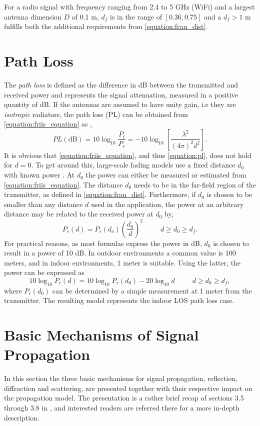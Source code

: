 \documentclass{LTHthesis}
\begin{document}
For a radio signal with frequency ranging from 2.4 to 5 GHz (WiFi) and a largest antenna dimension $D$ of 0.1 m, $d_f$ is in the
range of $\left[0.36,0.75\right]$  and a $d_f>1$ m fulfills both the additional requirements from \ref{equation:frau_dist}.
%
\section{Path Loss}
%
The \emph{path loss} is defined as the difference in dB between the transmitted and received power and represents the signal attenuation, measured in a positive quantity of dB. If the antennas are assumed to have unity gain, i.e they are \emph{isotropic} radiators, the path loss (PL) can be obtained from \ref{equation:friis_equation} as \cite{rappaport96}, 
%
\begin{equation}
PL\left(\text{dB}\right)=10\log_{10}{\frac{P_t}{P_r}}=-10\log_{10}{\left[\frac{\lambda^2}{\left(4\pi\right)^2d^2}\right]}\label{equation:pl}.
\end{equation} 
%
It is obvious that \ref{equation:friis_equation}, and thus \ref{equation:pl}, does not hold for $d=0$. To get around this, large-scale fading models use a fixed distance $d_0$ with known power \cite{rappaport96}. At $d_0$ the power can either be measured or estimated from \ref{equation:friis_equation}. The distance $d_0$ needs to be in the far-field region of the transmitter, as defined in \ref{equation:frau_dist}. Furthermore, if $d_0$ is chosen to be smaller than any distance $d$ used in the application, the power at an arbitrary distance may be related to the received power at $d_0$ by,
%
\begin{equation}
P_r(d)=P_r(d_o)\left(\frac{d_0}{d}\right)^2 \hspace{30pt} d\geq d_0\geq d_f.
\end{equation}
%
For practical reasons, as most formulas express the power in dB, $d_0$ is chosen to result in a power of 10 dB. In outdoor environments a common value is 100 meters, and in indoor environments, 1 meter is suitable. Using the latter, the power can be expressed as
%
\begin{equation}
10\log_{10}{P_r(d)}=10\log_{10}{P_r(d_0)}-20\log_{10}{d} \hspace{30pt} d\geq d_0\geq d_f,
\end{equation}   
%
where $P_r(d_0)$ can be determined by a simple measurement at 1 meter from the transmitter. The resulting model represents the indoor LOS path loss case.
%
\section{Basic Mechanisms of Signal Propagation}
%
In this section the three basic mechanisms for signal propagation, reflection, diffraction and scattering, are presented together with their respective impact on the propagation model. The presentation is a rather brief recap of sections 3.5 through 3.8 in  \cite{rappaport96}, and interested readers are referred there for a more in-depth description.  
%
\end{document}
